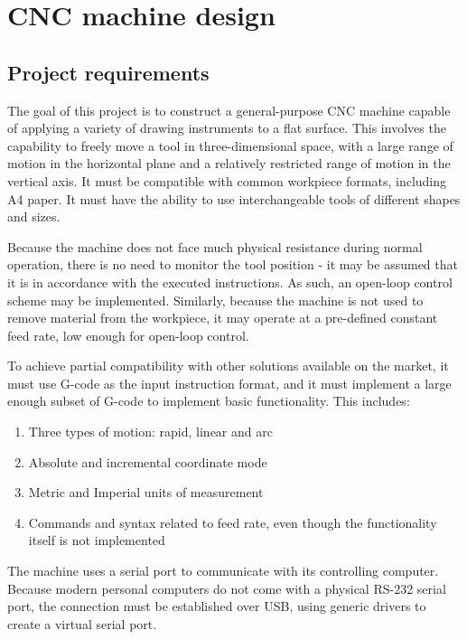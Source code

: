 \clearpage
\section{CNC machine design}

\subsection{Project requirements}

The goal of this project is to construct a general-purpose CNC machine capable
of applying a variety of drawing instruments to a flat surface. This involves
the capability to freely move a tool in three-dimensional space, with a large
range of motion in the horizontal plane and a relatively restricted range of
motion in the vertical axis. It must be compatible with common workpiece
formats, including A4 paper. It must have the ability to use interchangeable
tools of different shapes and sizes.

Because the machine does not face much physical resistance during normal
operation, there is no need to monitor the tool position - it may be assumed
that it is in accordance with the executed instructions. As such, an open-loop
control scheme may be implemented. Similarly, because the machine is not used
to remove material from the workpiece, it may operate at a pre-defined constant
feed rate, low enough for open-loop control.

To achieve partial compatibility with other solutions available on the market,
it must use G-code as the input instruction format, and it must implement a
large enough subset of G-code to implement basic functionality. This includes:
\begin{enumerate}
    \item Three types of motion: rapid, linear and arc
    \item Absolute and incremental coordinate mode
    \item Metric and Imperial units of measurement
    \item Commands and syntax related to feed rate, even though the
    functionality itself is not implemented
\end{enumerate}

The machine uses a serial port to communicate with its controlling computer.
Because modern personal computers do not come with a physical RS-232 serial
port, the connection must be established over USB, using generic drivers to
create a virtual serial port.

